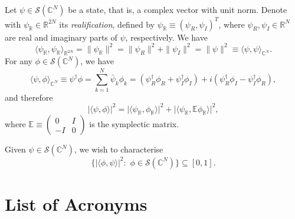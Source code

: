 \documentclass[12pt]{report}
\newcommand{\CC}{\mathbb{C}}
\newcommand{\EE}{\mathbb{E}}
\newcommand{\RR}{\mathbb{R}}
\newcommand{\calS}{{\mathcal{S}}}
\begin{document}
Let $\psi\in\calS(\CC^N)$ be a state, that is, a complex vector with unit norm.
Denote with $\psi_\RR\in\RR^{2N}$ its \emph{realification}, defined by
$\psi_\RR\equiv(\psi_R,\psi_I)^T$, where $\psi_R,\psi_I\in\RR^N$ are real and imaginary parts of $\psi$, respectively. We have
\begin{equation}
	\langle \psi_\RR,\psi_\RR\rangle_{\RR^{2N}}
	= \|\psi_\RR\|^2 = \|\psi_R\|^2 + \|\psi_I\|^2
	= \|\psi\|^2 \equiv \langle \psi,\psi\rangle_{\CC^N}.
\end{equation}
For any $\phi\in\calS(\CC^N)$, we have
\begin{equation}
	\langle \psi,\phi\rangle_{\CC^N}
	\equiv \psi^\dagger \phi
	= \sum_{k=1}^N \bar\psi_k \phi_k
	= (\psi_R^\dagger\phi_R + \psi_I^\dagger \phi_I)
	+ i(\psi_R^\dagger \phi_I - \psi_I^\dagger\phi_R),
\end{equation}
and therefore
\begin{equation}
	\lvert\langle \psi,\phi\rangle\rvert^2
	= \lvert \langle \psi_\RR,\phi_\RR\rangle \rvert^2
	+ \lvert \langle \psi_\RR,\EE\phi_\RR\rangle \rvert^2,
\end{equation}
where $\EE\equiv \begin{pmatrix}0 & I \\ -I & 0\end{pmatrix}$ is the symplectic matrix.

Given $\psi\in\calS(\CC^N)$, we wish to characterise
\begin{equation}
	\{ \lvert\langle \phi,\psi\rangle\rvert^2 : \,\,\phi\in\calS(\CC^N) \}
	\subseteq [0,1].
\end{equation}



\printbibliography

\section*{List of Acronyms}
\begin{acronym}
\end{acronym}
\end{document}
